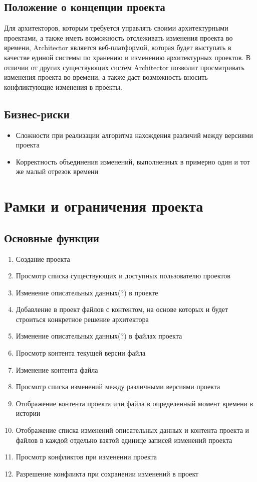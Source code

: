 \documentclass[a4paper,14pt]{extreport} %
\begin{document}
 
 \subsection{Положение о концепции проекта}
 
Для архитекторов, которым требуется управлять своими архитектурными проектами, а также иметь возможность отслеживать изменения проекта во времени, Architector является веб-платформой, которая будет выступать в качестве единой системы по хранению и изменению архитектурных проектов. В отличии от других существующих систем Architector позволит  просматривать изменения проекта во времени, а также даст возможность вносить конфликтующие изменения в проекты.


\subsection{Бизнес-риски}
 
\begin{itemize}
\item Сложности при реализации алгоритма нахождения различий между версиями проекта
\item Корректность объединения изменений, выполненных  в примерно один и тот же малый отрезок времени
\end {itemize}

\newpage

\section{Рамки и ограничения проекта}
\subsection{Основные функции}

\begin{enumerate}
\item Создание проекта
\item Просмотр списка существующих и доступных пользователю проектов
\item Изменение описательных данных(?) в проекте
\item Добавление в проект файлов с контентом, на основе которых и будет строиться конкретное решение архитектора
\item Изменение описательных данных(?) в файлах проекта
\item Просмотр контента текущей версии файла
\item Изменение контента файла
\item Просмотр списка изменений между различными версиями проекта
\item Отображение контента проекта или файла в определенный момент времени в истории
\item Отображение списка изменений описательных данных и контента проекта и файлов в каждой отдельно взятой единице записей изменений проекта
\item Просмотр конфликтов при изменении проекта
\item Разрешение конфликта при сохранении изменений в проект
\end {enumerate}
\end{document}

